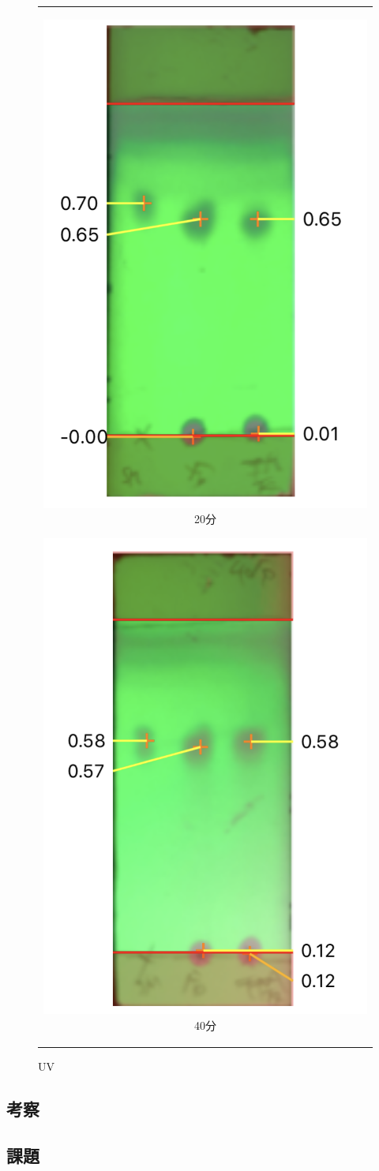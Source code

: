 \documentclass[a4paper,papersize,dvipdfmx]{jsarticle}
\begin{document}
\begin{figure}[htbp]
\begin{center}
\begin{tabular}{c}

\begin{minipage}{0.19\hsize}
\begin{center}
\includegraphics[clip, width=0.3\linewidth]{imgs6/tlc-u20.PNG}
\hspace{0.2cm} 20分
\end{center}
\end{minipage}

\begin{minipage}{0.19\hsize}
\begin{center}
\includegraphics[clip, width=0.3\linewidth]{imgs6/tlc-u40.PNG}
\hspace{0.2cm} 40分
\end{center}
\end{minipage}

\end{tabular}
\caption{UV}
\end{center}
\end{figure}
\subsection*{考察}
\subsection*{課題}
\end{document}
